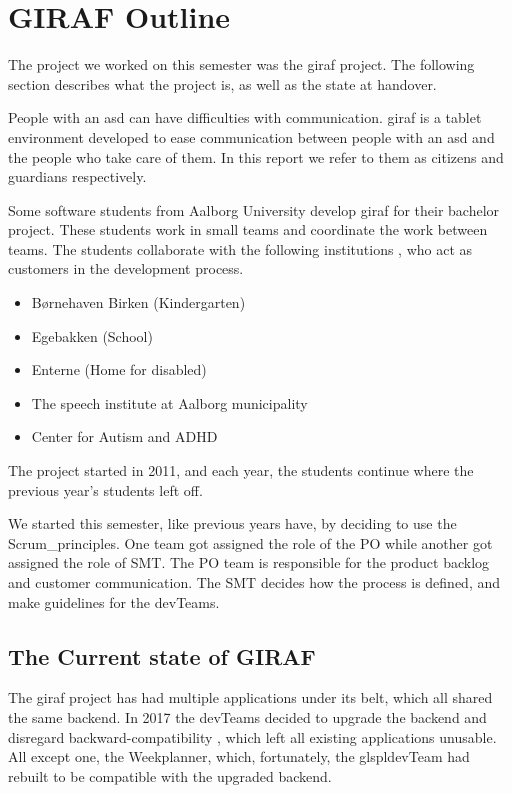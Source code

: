 \chapter{GIRAF Outline}

The project we worked on this semester was the \gls{giraf} project. The following section describes what the project is, as well as the state at handover.

People with an \gls{asd} can have difficulties with communication. \gls{giraf} is a tablet environment developed to ease communication between people with an \gls{asd} and the people who take care of them. In this report we refer to them as \glspl{citizen} and \glspl{guardian} respectively.

Some software students from Aalborg University develop \gls{giraf} for their bachelor project. These students work in small teams and coordinate the work between teams. The students collaborate with the following institutions \cite{GirafWebsite}, who act as customers in the development process.

\begin{itemize}
    \item Børnehaven Birken (Kindergarten) \cite{bhBirken}
    \item Egebakken (School) \cite{egebakken}
    \item Enterne (Home for disabled) \cite{enterne}
    \item The speech institute at Aalborg municipality
    \item Center for Autism and ADHD \cite{center_for_autism}
\end{itemize}

The project started in 2011, and each year, the students continue where the previous year's students left off. 

We started this semester, like previous years have, by deciding to use the \gls{Scrum_principles}. One team got assigned the role of the \gls{PO}  while another got assigned the role of \gls{SMT}. The \gls{PO} team is responsible for the product backlog and customer communication. The \gls{SMT} decides how the process is defined, and make guidelines for the \glspl{devTeam}.

\section{The Current state of GIRAF}

The \gls{giraf} project has had multiple applications under its belt, which all shared the same backend. In 2017 the \glspl{devTeam} decided to upgrade the backend and disregard backward-compatibility \cite{SW608F18}, which left all existing applications unusable. All except one, the Weekplanner, which, fortunately, the glspl{devTeam} had rebuilt to be compatible with the upgraded backend.

